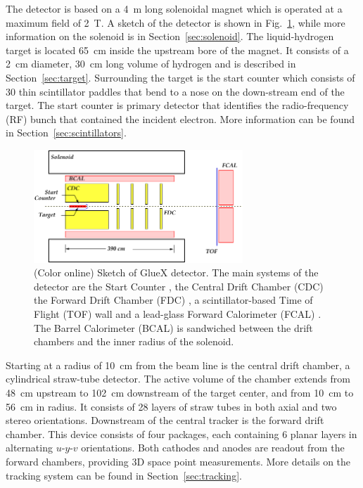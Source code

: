 The \gx{} detector is based on a 4~m long solenoidal magnet which is operated at a maximum field of 2~T. A sketch of the detector is shown in Fig.~\ref{fig:gluexsketch}, while more information on the solenoid is in Section~\ref{sec:solenoid}. The liquid-hydrogen target is located 65~cm inside the upstream bore of the magnet. It consists of a 2~cm diameter, 30~cm long volume of hydrogen and is described in Section~\ref{sec:target}. Surrounding the target is the start counter which consists of 30 thin scintillator paddles that bend to a nose on the down-stream end of the target. The start counter is primary detector that identifies the radio-frequency (RF) bunch that contained the incident electron. More information can be found in Section~\ref{sec:scintillators}. 
\begin{figure}[htbp]\centering
\includegraphics[width=0.7\textwidth]{figures/GlueX_Sketch.pdf}  
\caption{\label{fig:gluexsketch} (Color online)         
Sketch of GlueX detector.  The main systems of the detector are the Start Counter \cite{Pooser:2019rhu}, the Central Drift Chamber (CDC) \cite{VanHaarlem:2010yq} the Forward Drift Chamber (FDC) \cite{Pentchev2017281}, a scintillator-based Time of Flight (TOF) wall and a lead-glass Forward Calorimeter (FCAL) \cite{MORIYA201360}. The Barrel Calorimeter (BCAL) is sandwiched between the drift chambers and the inner radius of the solenoid.}   
\end{figure}

Starting at a radius of 10~cm from the beam line is the central drift chamber, a cylindrical straw-tube detector. The active volume of the chamber extends from 48~cm upstream to 102~cm downstream of the target center, and from 10~cm to 56~cm in radius. It consists of 28 layers of straw tubes in both axial and two stereo orientations. Downstream of the central tracker is the forward drift chamber. This device consists of four packages, each containing 6 planar layers in alternating $u$-$y$-$v$ orientations. Both cathodes and anodes are readout from the forward chambers, providing 3D space point measurements. More details on the tracking system can be found in Section~\ref{sec:tracking}. 

